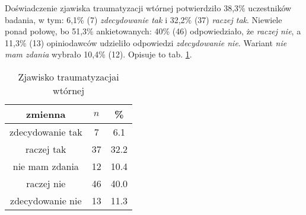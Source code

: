Doświadczenie zjawiska traumatyzacji wtórnej potwierdziło 38,3\% uczestników badania, w tym: 6,1\% (7) \textit{zdecydowanie tak} i 32,2\% (37) \textit{raczej tak}. Niewiele ponad połowę, bo  51,3\% ankietowanych: 40\% (46) odpowiedziało, że \textit{raczej nie}, a  11,3\% (13) opiniodawców udzieliło odpowiedzi \textit{zdecydowanie nie}. Wariant \textit{nie mam zdania} wybrało 10,4\% (12). Opisuje to tab. \ref{tab:Q11}.


\begin{table}[H]
\caption{Zjawisko traumatyzacjai wtórnej}
\centering
\begin{tabular}{ | c | c | c |}
\hline
zmienna & $n$ & \% \\
\hline
zdecydowanie tak  &  7  & 6.1 \\
\hline
raczej tak  &  37  & 32.2\\
\hline
nie mam zdania  &  12  & 10.4\\
\hline
raczej nie  &  46  & 40.0 \\
\hline
zdecydowanie nie  &  13  & 11.3\\
\hline
\end{tabular}
\label{tab:Q11}
\end{table}